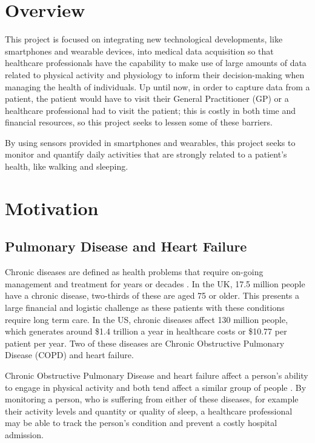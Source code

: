 

    \chapter{Overview}

        This project is focused on integrating new technological developments, like smartphones and wearable devices, into medical data acquisition so that healthcare professionals have the capability to make use of large amounts of data related to physical activity and physiology to inform their decision-making when managing the health of individuals. Up until now, in order to capture data from a patient, the patient would have to visit their General Practitioner (GP) or a healthcare professional had to visit the patient; this is costly in both time and financial resources, so this project seeks to lessen some of these barriers. 

        By using sensors provided in smartphones and wearables, this project seeks to monitor and quantify daily activities that are strongly related to a patient's health, like walking and sleeping.

    \chapter{Motivation}

        \section{Pulmonary Disease and Heart Failure}

            Chronic diseases are defined as health problems that require on-going management and treatment for years or decades \cite{chronic_diseases}. In the UK, 17.5 million people have a chronic disease, two-thirds of these are aged 75 or older. This presents a large financial and logistic challenge as these patients with these conditions require long term care. In the US, chronic diseases affect 130 million people, which generates around \$1.4 trillion a year in healthcare costs \cite{chronic_diseases} or \$10.77 per patient per year. Two of these diseases are Chronic Obstructive Pulmonary Disease (COPD) and heart failure. 

            Chronic Obstructive Pulmonary Disease and heart failure affect a person's ability to engage in physical activity and both tend affect a similar group of people \cite{copd_nhs, heart_failure_stats}. By monitoring a person, who is suffering from either of these diseases, for example their activity levels and quantity or quality of sleep, a healthcare professional may be able to track the person's condition and prevent a costly hospital admission.

